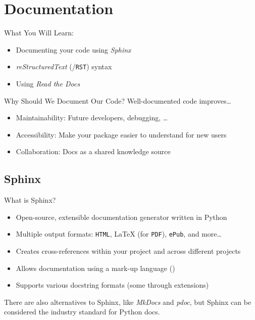 \section{Documentation}


\begin{frame}[fragile]{What You Will Learn:}
  \begin{itemize}
    \item Documenting your code using \emph{Sphinx}
    \item \emph{reStructuredText} (\reST/\texttt{RST}) syntax
    \item Using \emph{Read the Docs}
  \end{itemize}
\end{frame}


\begin{frame}[fragile]{Why Should We Document Our Code?}
  Well-documented code improves\dots
  \begin{itemize}
    \item Maintainability: Future developers, debugging, \dots
    \item Accessibility: Make your package easier to understand for new users
    \item Collaboration: Docs as a shared knowledge source
  \end{itemize}
\end{frame}

\subsection{Sphinx}
\begin{frame}[fragile]{
  What is Sphinx?
  \hfill
  }
  \begin{itemize}
    \setlength{\itemsep}{1em}
    \item Open-source, extensible documentation generator written in Python
    \item Multiple output formats: \texttt{HTML}, \LaTeX{} (for \texttt{PDF}), \texttt{ePub}, and more\dots
    \item Creates cross-references within your project and across different projects
    \item Allows documentation using a mark-up language (\reST)
    \item Supports various docstring formats (some through extensions)
  \end{itemize}

  \vspace{1cm}
  There are also alternatives to Sphinx, like \emph{MkDocs} and \emph{pdoc}, but Sphinx can be considered the industry standard for Python docs.
\end{frame}


